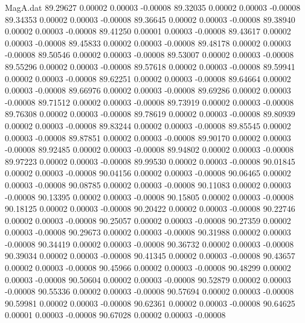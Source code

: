 \begin{filecontents}{MagA.dat}
  89.29627    0.00002    0.00003   -0.00008
  89.32035    0.00002    0.00003   -0.00008
  89.34353    0.00002    0.00003   -0.00008
  89.36645    0.00002    0.00003   -0.00008
  89.38940    0.00002    0.00003   -0.00008
  89.41250    0.00001    0.00003   -0.00008
  89.43617    0.00002    0.00003   -0.00008
  89.45833    0.00002    0.00003   -0.00008
  89.48178    0.00002    0.00003   -0.00008
  89.50546    0.00002    0.00003   -0.00008
  89.53007    0.00002    0.00003   -0.00008
  89.55296    0.00002    0.00003   -0.00008
  89.57618    0.00002    0.00003   -0.00008
  89.59941    0.00002    0.00003   -0.00008
  89.62251    0.00002    0.00003   -0.00008
  89.64664    0.00002    0.00003   -0.00008
  89.66976    0.00002    0.00003   -0.00008
  89.69286    0.00002    0.00003   -0.00008
  89.71512    0.00002    0.00003   -0.00008
  89.73919    0.00002    0.00003   -0.00008
  89.76308    0.00002    0.00003   -0.00008
  89.78619    0.00002    0.00003   -0.00008
  89.80939    0.00002    0.00003   -0.00008
  89.83244    0.00002    0.00003   -0.00008
  89.85545    0.00002    0.00003   -0.00008
  89.87851    0.00002    0.00003   -0.00008
  89.90170    0.00002    0.00003   -0.00008
  89.92485    0.00002    0.00003   -0.00008
  89.94802    0.00002    0.00003   -0.00008
  89.97223    0.00002    0.00003   -0.00008
  89.99530    0.00002    0.00003   -0.00008
  90.01845    0.00002    0.00003   -0.00008
  90.04156    0.00002    0.00003   -0.00008
  90.06465    0.00002    0.00003   -0.00008
  90.08785    0.00002    0.00003   -0.00008
  90.11083    0.00002    0.00003   -0.00008
  90.13395    0.00002    0.00003   -0.00008
  90.15805    0.00002    0.00003   -0.00008
  90.18125    0.00002    0.00003   -0.00008
  90.20422    0.00002    0.00003   -0.00008
  90.22746    0.00002    0.00003   -0.00008
  90.25057    0.00002    0.00003   -0.00008
  90.27359    0.00002    0.00003   -0.00008
  90.29673    0.00002    0.00003   -0.00008
  90.31988    0.00002    0.00003   -0.00008
  90.34419    0.00002    0.00003   -0.00008
  90.36732    0.00002    0.00003   -0.00008
  90.39034    0.00002    0.00003   -0.00008
  90.41345    0.00002    0.00003   -0.00008
  90.43657    0.00002    0.00003   -0.00008
  90.45966    0.00002    0.00003   -0.00008
  90.48299    0.00002    0.00003   -0.00008
  90.50604    0.00002    0.00003   -0.00008
  90.52879    0.00002    0.00003   -0.00008
  90.55336    0.00002    0.00003   -0.00008
  90.57694    0.00002    0.00003   -0.00008
  90.59981    0.00002    0.00003   -0.00008
  90.62361    0.00002    0.00003   -0.00008
  90.64625    0.00001    0.00003   -0.00008
  90.67028    0.00002    0.00003   -0.00008

\end{filecontents}
